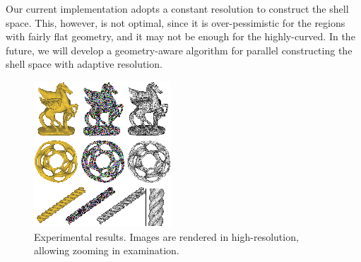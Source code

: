    Our current implementation adopts a constant resolution to construct the shell space.
   This, however, is not optimal, since it is over-pessimistic for the regions with fairly flat geometry,
   and it may not be enough for the highly-curved.
   In the future, we will develop a geometry-aware algorithm for parallel constructing the shell space with adaptive resolution.

\begin{figure}[tbh]
\centerline{\includegraphics[width=0.9\linewidth]{figs/gcvt/models4}}
\vspace{-0.1in}
\caption{Experimental results. Images are rendered in high-resolution, allowing zooming in examination.}
  \label{fig:other models}
\end{figure}





